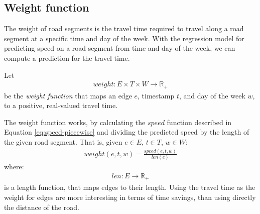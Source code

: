 

\subsection{Weight function}\label{sec:weight-function}
The weight of road segments is the travel time required to travel along a road segment at a specific time and day of the week. With the regression model for predicting speed on a road segment from time and day of the week, we can compute a prediction for the travel time. 

Let
\begin{align}
weight: E \times T \times W \rightarrow \mathbb{R_+}
\end{align}
be the \emph{weight function} that maps an edge $e$, timestamp $t$, and day of the week $w$, to a positive, real-valued travel time.

The weight function works, by calculating the $speed$ function described in Equation \ref{eq:speed-piecewise} and dividing the predicted speed by the length of the given road segment. That is, given $e \in E$, $t \in T$, $w \in W$:
\begin{align}
weight(e,t,w) = \frac{speed(e,t,w)}{len(e)}
\end{align}
where:
\begin{align}
len:E \rightarrow \mathbb{R_+}
\end{align}
is a length function, that maps edges to their length.
Using the travel time as the weight for edges are more interesting in terms of time savings, than using directly the distance of the road.